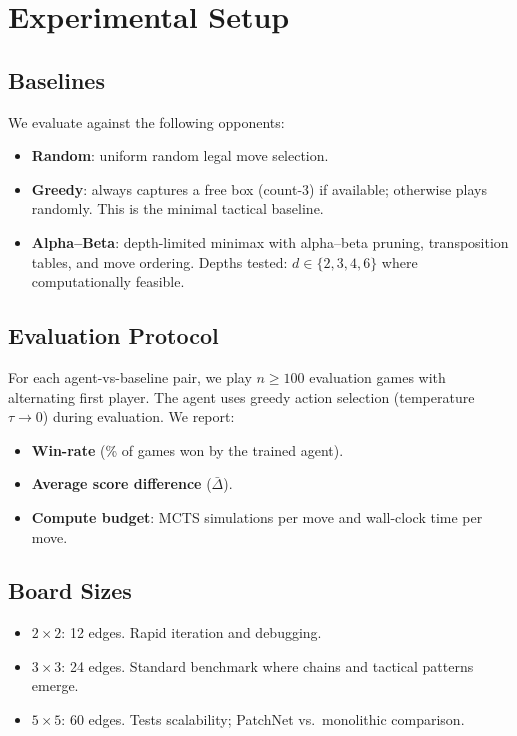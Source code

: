\documentclass[11pt]{article}
\begin{document}
\section{Experimental Setup}
\label{sec:experiments}

\subsection{Baselines}
We evaluate against the following opponents:
\begin{itemize}
  \item \textbf{Random}: uniform random legal move selection.
  \item \textbf{Greedy}: always captures a free box (count-3) if
    available; otherwise plays randomly. This is the minimal tactical
    baseline.
  \item \textbf{Alpha--Beta}: depth-limited minimax with alpha--beta
    pruning, transposition tables, and move ordering. Depths tested:
    $d \in \{2, 3, 4, 6\}$ where computationally feasible.
\end{itemize}

\subsection{Evaluation Protocol}
For each agent-vs-baseline pair, we play $n \ge 100$ evaluation games
with alternating first player. The agent uses greedy action selection
(temperature $\tau \to 0$) during evaluation. We report:
\begin{itemize}
  \item \textbf{Win-rate} (\% of games won by the trained agent).
  \item \textbf{Average score difference} ($\bar{\Delta}$).
  \item \textbf{Compute budget}: MCTS simulations per move and wall-clock
    time per move.
\end{itemize}

\subsection{Board Sizes}
\begin{itemize}
  \item \textbf{$2{\times}2$}: 12 edges. Rapid iteration and debugging.
  \item \textbf{$3{\times}3$}: 24 edges. Standard benchmark where chains and
    tactical patterns emerge.
  \item \textbf{$5{\times}5$}: 60 edges. Tests scalability; PatchNet vs.\ 
    monolithic comparison.
\end{itemize}
\end{document}
